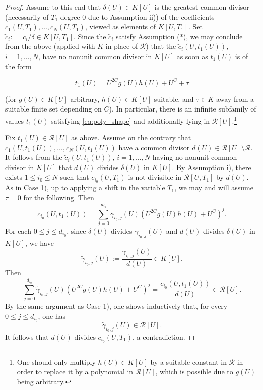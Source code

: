\documentclass[11pt,a4paper,reqno]{amsart}
\theoremstyle{definition}
\begin{document}
\begin{proof}
Assume to this end that $\delta(U)\in K[U]$ is the greatest common divisor (necessarily of $T_1$-degree $0$ due to Assumption ii)) of the coefficients $c_1(U,T_1),\dots, c_N(U,T_1)$, viewed as elements of $K[U,T_1]$.
Set 
$\tilde{c}_i : =c_i/\delta\in K[U,T_1]$.
Since the $\tilde{c}_i$ satisfy Assumption (*), we may conclude from the above (applied with $K$ in place of $\mathcal{R}$) that the $\tilde{c}_i(U,t_1(U))$, $i=1,\dots, N$, have no nonunit common divisor in $K[U]$ as soon as $t_1(U)$ is of the form 

\begin{equation} 
\label{eq:poly_shape} 
t_1(U)= U^{2C}g(U)h(U) + U^C + \tau
\end{equation}


\noindent
(for $g(U)\in K[U]$ arbitrary, $h(U)\in K[U]$ suitable, and $\tau\in K$ away from a suitable finite set depending on $C$). In particular, there is an infinite subfamily of values 
$t_1(U)$ satisfying \eqref{eq:poly_shape} and additionally lying in $\mathcal R[U]$.\footnote{One should only multiply $h(U)\in K[U]$ by a suitable constant in $\mathcal{R}$ in order to replace it by a polynomial in $\mathcal{R}[U]$, which is possible due to $g(U)$ being arbitrary.} 

Fix  $t_1(U)\in \mathcal R[U]$ as above. Assume on the contrary that $c_1(U,t_1(U)),\dots,c_N(U,t_1(U))$ have a common divisor $d(U) \in \mathcal{R}[U] \setminus \mathcal{R}$. It follows from the $\tilde{c}_i(U,t_1(U))$, $i=1,\dots, N$ having no nonunit common divisor in $K[U]$ that $d(U)$ divides $\delta(U)$ in $K[U]$.
By Assumption i), there exists $1 \leq i_0 \leq N$ such that $c_{i_0}(U,T_1)$ is not divisible in ${\mathcal R}[U,T_1]$ by $d(U)$. 
As in Case 1), up to applying a shift in the variable $T_1$, we may and will assume $\tau=0$ for the following. 
%
Then
$$
c_{i_0}(U,t_1(U))=\sum_{j=0}^{d_{i_0}} \gamma_{i_0,j}(U)\left(U^{2C}g(U)h(U) + U^C\right)^j.
$$
For each $0 \leq j \leq d_{i_0}$, since $\delta(U)$  divides $\gamma_{i_0,j}(U)$ and $d(U)$ divides $\delta(U)$ in $K[U]$, we have 
$$
\tilde{\gamma}_{i_0,j}(U):=\frac{\gamma_{i_0,j}(U)}{d(U)} \in K[U].
$$
Then
$$
\sum_{j=0}^{d_{i_0}} \tilde{\gamma}_{i_0,j}(U)\left(U^{2C}g(U)h(U) + U^C\right)^j=\frac{c_{i_0}(U,t_1(U))}{d(U)} \in \mathcal{R}[U].
$$ By the same argument as Case 1), one shows inductively that, for every $0 \leq j \leq d_{i_0}$, one has 
$$\tilde{\gamma}_{i_0,j}(U) \in \mathcal{R}[U].
$$ It follows that $d(U)$ divides $c_{i_0}(U,T_1)$, a contradiction.
\end{proof}
\end{document}
